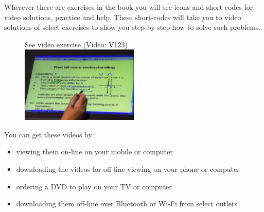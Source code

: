 {\Large

Wherever there are exercises in the book you will see icons and short-codes for video solutions,
practice and help. These short-codes will take you to video solutions of select exercises to show you
step-by-step how to solve such problems. \par

\begin{figure}[h]
\begin{center}
See video exercise  (Video: V123)\\ 
\includegraphics[width=0.5\textwidth]{title_images/mindsetexercise.eps}
\end{center}
\end{figure}
You can get these videos by:
\begin{itemize}
    \item viewing them on-line on your mobile or computer
    \item downloading the videos for off-line viewing on your phone or computer
    \item ordering a DVD to play on your TV or computer
    \item downloading them off-line over Bluetooth or Wi-Fi from select outlets
\end{itemize}
}


